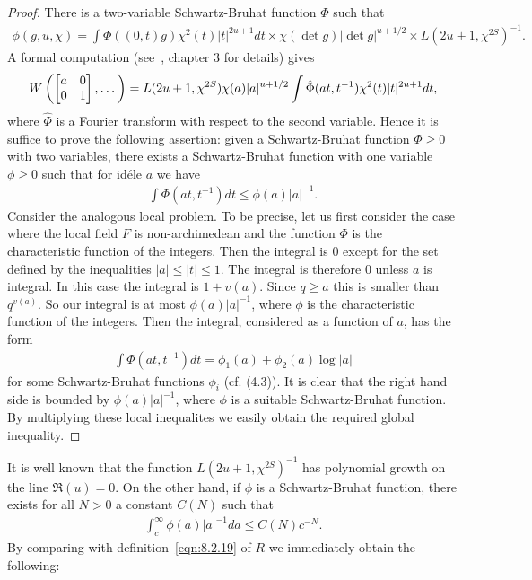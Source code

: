 \begin{proof}
There is a two-variable Schwartz-Bruhat function $\Phi$ such that
\begin{align*}
    \phi(g, u, \chi) = \int \Phi((0, t)g) \chi^2(t) |t|^{2u+1} dt \times \chi(\det g)|\det g|^{u + 1/2} \times L(2u+1, \chi^{2S})^{-1}.
\end{align*}
A formal computation (see~\cite{jacquet2006automorphic}, chapter 3 for details) gives
\begin{align*}
    W\left(\begin{bmatrix} a & 0 \\ 0 & 1 \end{bmatrix}, \dots \right) = L(2u+1, \chi^{2S}) \chi(a)|a|^{u+1/2} \int \hat{\Phi}(at, t^{-1}) \chi^{2}(t)|t|^{2u+1} dt,
\end{align*}
where $\hat{\Phi}$ is a Fourier transform with respect to the second variable.
Hence it is suffice to prove the following assertion: given a Schwartz-Bruhat function $\Phi\geq 0$ with two variables,
there exists a Schwartz-Bruhat function with one variable $\phi\geq 0$ such that for id\'ele $a$ we have
\begin{align*}
    \int \Phi(at, t^{-1}) dt \leq \phi(a) |a|^{-1}.
\end{align*}
Consider the analogous local problem.
To be precise, let us first consider the case where the local field $F$ is non-archimedean and the function $\Phi$ is the characteristic function of the integers.
{\color{red}
Then the integral is 0 except for the set defined by the inequalities $|a|\leq|t|\leq 1$.
The integral is therefore 0 unless $a$ is integral.
In this case the integral is $1+v(a)$.
Since $q\geq a$ this is smaller than $q^{v(a)}$.
}
So our integral is at most $\phi(a)|a|^{-1}$, where $\phi$ is the characteristic function of the integers.
Then the integral, considered as a function of $a$, has the form
\begin{align*}
    \int \Phi(at, t^{-1})dt = \phi_1(a) + \phi_2(a) \log |a|
\end{align*}
for some Schwartz-Bruhat functions $\phi_i$ (cf. (4.3)).
It is clear that the right hand side is bounded by $\phi(a)|a|^{-1}$, where $\phi$ is a suitable Schwartz-Bruhat function.
By multiplying these local inequalites we easily obtain the required global inequality.
\end{proof}

It is well known that the function $L(2u+1, \chi^{2S})^{-1}$ has polynomial growth on the line $\Re(u)=0$.
On the other hand, if $\phi$ is a Schwartz-Bruhat function, there exists for all $N>0$ a constant $C(N)$ such that
\begin{align*}
    \int_{c}^{\infty} \phi(a)|a|^{-1}da \leq C(N) c^{-N}.
\end{align*}
By comparing with definition~\eqref{eqn:8.2.19} of $R$ we immediately obtain the following:

